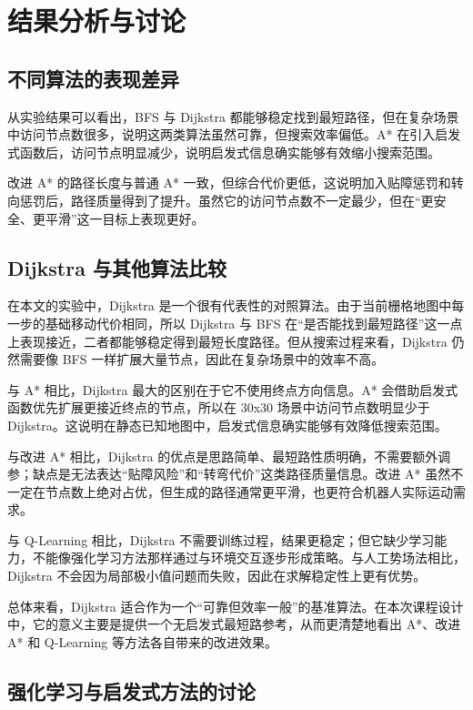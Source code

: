 \chapter{结果分析与讨论}\label{chap:analysis}

\section{不同算法的表现差异}

从实验结果可以看出，BFS 与 Dijkstra 都能够稳定找到最短路径，但在复杂场景中访问节点数很多，说明这两类算法虽然可靠，但搜索效率偏低。A* 在引入启发式函数后，访问节点明显减少，说明启发式信息确实能够有效缩小搜索范围。

改进 A* 的路径长度与普通 A* 一致，但综合代价更低，这说明加入贴障惩罚和转向惩罚后，路径质量得到了提升。虽然它的访问节点数不一定最少，但在“更安全、更平滑”这一目标上表现更好。

\section{Dijkstra 与其他算法比较}

在本文的实验中，Dijkstra 是一个很有代表性的对照算法。由于当前栅格地图中每一步的基础移动代价相同，所以 Dijkstra 与 BFS 在“是否能找到最短路径”这一点上表现接近，二者都能够稳定得到最短长度路径。但从搜索过程来看，Dijkstra 仍然需要像 BFS 一样扩展大量节点，因此在复杂场景中的效率不高。

与 A* 相比，Dijkstra 最大的区别在于它不使用终点方向信息。A* 会借助启发式函数优先扩展更接近终点的节点，所以在 30x30 场景中访问节点数明显少于 Dijkstra。这说明在静态已知地图中，启发式信息确实能够有效降低搜索范围。

与改进 A* 相比，Dijkstra 的优点是思路简单、最短路性质明确，不需要额外调参；缺点是无法表达“贴障风险”和“转弯代价”这类路径质量信息。改进 A* 虽然不一定在节点数上绝对占优，但生成的路径通常更平滑，也更符合机器人实际运动需求。

与 Q-Learning 相比，Dijkstra 不需要训练过程，结果更稳定；但它缺少学习能力，不能像强化学习方法那样通过与环境交互逐步形成策略。与人工势场法相比，Dijkstra 不会因为局部极小值问题而失败，因此在求解稳定性上更有优势。

总体来看，Dijkstra 适合作为一个“可靠但效率一般”的基准算法。在本次课程设计中，它的意义主要是提供一个无启发式最短路参考，从而更清楚地看出 A*、改进 A* 和 Q-Learning 等方法各自带来的改进效果。

\section{强化学习与启发式方法的讨论}

